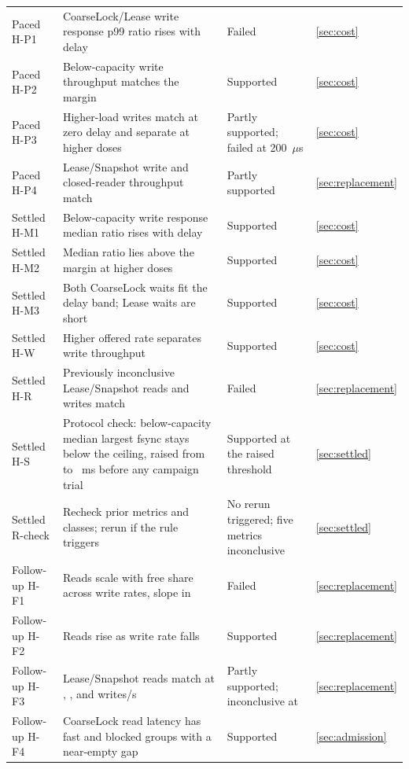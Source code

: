 \documentclass[conference]{IEEEtran}
\begin{document}
\begin{table}[t]
\begin{tabular}{lp{}ll}
Paced H-P1 & CoarseLock/Lease write response p99 ratio rises with delay & Failed & \ref{sec:cost}\\
Paced H-P2 & Below-capacity write throughput matches the margin & Supported & \ref{sec:cost}\\
Paced H-P3 & Higher-load writes match at zero delay and separate at higher doses & Partly supported; failed at 200~$\mu$s & \ref{sec:cost}\\
Paced H-P4 & Lease/Snapshot write and closed-reader throughput match & Partly supported & \ref{sec:replacement}\\
Settled H-M1 & Below-capacity write response median ratio rises with delay & Supported & \ref{sec:cost}\\
Settled H-M2 & Median ratio lies above the margin at higher doses & Supported & \ref{sec:cost}\\
Settled H-M3 & Both CoarseLock waits fit the delay band; Lease waits are short & Supported & \ref{sec:cost}\\
Settled H-W & Higher offered rate separates write throughput & Supported & \ref{sec:cost}\\
Settled H-R & Previously inconclusive Lease/Snapshot reads and writes match & Failed & \ref{sec:replacement}\\
Settled H-S & Protocol check: below-capacity median largest fsync stays below the ceiling, raised from \HSDraftMs{} to \HSThresholdMs{}~ms before any campaign trial & Supported at the raised threshold & \ref{sec:settled}\\
Settled R-check & Recheck prior metrics and classes; rerun if the rule triggers & No rerun triggered; five metrics inconclusive & \ref{sec:settled}\\
Follow-up H-F1 & Reads scale with free share across write rates, slope in \FollowSlopeBand{} & Failed & \ref{sec:replacement}\\
Follow-up H-F2 & Reads rise as write rate falls & Supported & \ref{sec:replacement}\\
Follow-up H-F3 & Lease/Snapshot reads match at \FollowRateLow{}, \FollowRateSecond{}, and \FollowRateThird{} writes/s & Partly supported; inconclusive at \FollowRateThird{} & \ref{sec:replacement}\\
Follow-up H-F4 & CoarseLock read latency has fast and blocked groups with a near-empty gap & Supported & \ref{sec:admission}\\\bottomrule
\end{tabular}
\end{table}
\end{document}
